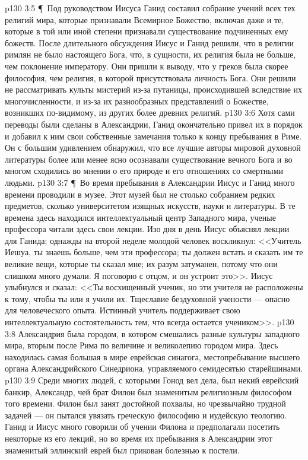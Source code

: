 \vs p130 3:5 \P\ Под руководством Иисуса Ганид составил собрание учений всех тех религий мира, которые признавали Всемирное Божество, включая даже и те, которые в той или иной степени признавали существование подчиненных ему божеств. После длительного обсуждения Иисус и Ганид решили, что в религии римлян не было настоящего Бога, что, в сущности, их религия была не больше, чем поклонение императору. Они пришли к выводу, что у греков была скорее философия, чем религия, в которой присутствовала личность Бога. Они решили не рассматривать культы мистерий из\hyp{}за путаницы, происходившей вследствие их многочисленности, и из\hyp{}за их разнообразных представлений о Божестве, возникших по\hyp{}видимому, из других более древних религий.
\vs p130 3:6 Хотя сами переводы были сделаны в Александрии, Ганид окончательно привел их в порядок и добавил к ним свои собственные замечания только к концу пребывания в Риме. Он с большим удивлением обнаружил, что все лучшие авторы мировой духовной литературы более или менее ясно осознавали существование вечного Бога и во многом сходились во мнении о его природе и его отношениях со смертными людьми.
\vs p130 3:7 \P\ Во время пребывания в Александрии Иисус и Ганид много времени проводили в музее. Этот музей был не столько собранием редких предметов, сколько университетом изящных искусств, науки и литературы. В те времена здесь находился интеллектуальный центр Западного мира, ученые профессора читали здесь свои лекции. Изо дня в день Иисус объяснял лекции для Ганида; однажды на второй неделе молодой человек воскликнул: <<Учитель Иешуа, ты знаешь больше, чем эти профессора; ты должен встать и сказать им те великие вещи, которые ты сказал мне; их разум затуманен, потому что они слишком много думали. Я поговорю с отцом, и он устроит это>>. Иисус улыбнулся и сказал: <<Ты восхищенный ученик, но эти учителя не расположены к тому, чтобы ты или я учили их. Тщеславие бездуховной учености --- опасно для человеческого опыта. Истинный учитель поддерживает свою интеллектуальную состоятельность тем, что всегда остается учеником>>.
\vs p130 3:8 Александрия была городом, в котором смешались разные культуры западного мира, вторым после Рима по величине и великолепию городом мира. Здесь находилась самая большая в мире еврейская синагога, местопребывание высшего органа Александрийского Синедриона, управляемого семидесятью старейшинами.
\vs p130 3:9 Среди многих людей, с которыми Гонод вел дела, был некий еврейский банкир, Александр, чей брат Филон был знаменитым религиозным философом того времени. Филон был занят достойной похвалы, но чрезвычайно трудной задачей --- он пытался увязать греческую философию и иудейскую теологию. Ганид и Иисус много говорили об учении Филона и предполагали посетить некоторые из его лекций, но во время их пребывания в Александрии этот знаменитый эллинский еврей был прикован болезнью к постели.

